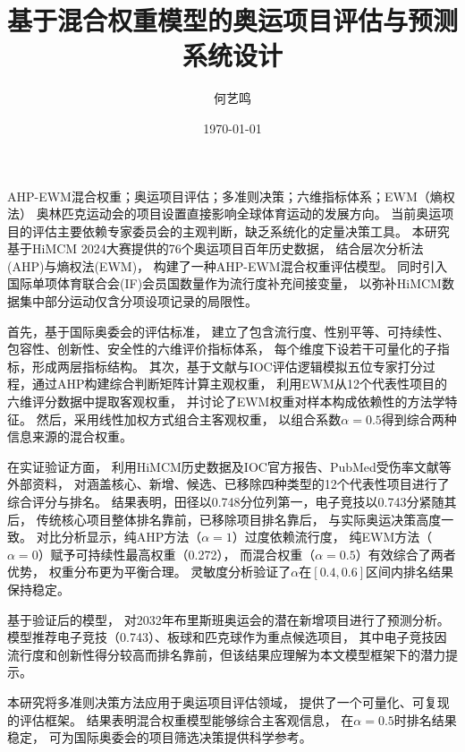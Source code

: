 \documentclass[twoside]{CUGThesis}
\title{基于混合权重模型的奥运项目评估与预测系统设计}
\author{何艺鸣}
\date{\today}
\begin{document}
\maketitle
\makestatement

\begin{cnabstract}{AHP-EWM混合权重；奥运项目评估；多准则决策；六维指标体系；EWM（熵权法）}
奥林匹克运动会的项目设置直接影响全球体育运动的发展方向。
当前奥运项目的评估主要依赖专家委员会的主观判断，缺乏系统化的定量决策工具。
本研究基于HiMCM 2024大赛提供的76个奥运项目百年历史数据，
结合层次分析法(AHP)与熵权法(EWM)，
构建了一种AHP-EWM混合权重评估模型。
同时引入国际单项体育联合会(IF)会员国数量作为流行度补充间接变量，
以弥补HiMCM数据集中部分运动仅含分项设项记录的局限性。

首先，基于国际奥委会的评估标准，
建立了包含流行度、性别平等、可持续性、包容性、创新性、安全性的六维评价指标体系，
每个维度下设若干可量化的子指标，形成两层指标结构。
其次，基于文献与IOC评估逻辑模拟五位专家打分过程，通过AHP构建综合判断矩阵计算主观权重，
利用EWM从12个代表性项目的六维评分数据中提取客观权重，
并讨论了EWM权重对样本构成依赖性的方法学特征。
然后，采用线性加权方式组合主客观权重，
以组合系数$\alpha=0.5$得到综合两种信息来源的混合权重。

在实证验证方面，
利用HiMCM历史数据及IOC官方报告、PubMed受伤率文献等外部资料，
对涵盖核心、新增、候选、已移除四种类型的12个代表性项目进行了综合评分与排名。
结果表明，田径以0.748分位列第一，电子竞技以0.743分紧随其后，
传统核心项目整体排名靠前，已移除项目排名靠后，
与实际奥运决策高度一致。
对比分析显示，纯AHP方法（$\alpha=1$）过度依赖流行度，
纯EWM方法（$\alpha=0$）赋予可持续性最高权重（0.272），
而混合权重（$\alpha=0.5$）有效综合了两者优势，
权重分布更为平衡合理。
灵敏度分析验证了$\alpha$在$[0.4,0.6]$区间内排名结果保持稳定。

基于验证后的模型，
对2032年布里斯班奥运会的潜在新增项目进行了预测分析。
模型推荐电子竞技（0.743）、板球和匹克球作为重点候选项目，
其中电子竞技因流行度和创新性得分较高而排名靠前，但该结果应理解为本文模型框架下的潜力提示。

本研究将多准则决策方法应用于奥运项目评估领域，
提供了一个可量化、可复现的评估框架。
结果表明混合权重模型能够综合主客观信息，
在$\alpha=0.5$时排名结果稳定，
可为国际奥委会的项目筛选决策提供科学参考。
\end{cnabstract}
\end{document}
